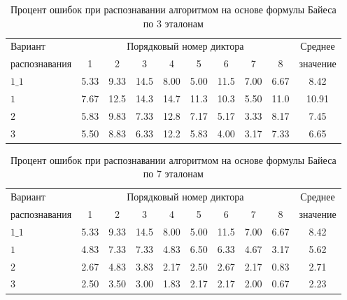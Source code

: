 \begin{table}[h]
	\centering
	\caption{Процент ошибок при распознавании алгоритмом на основе формулы Байеса по 3 эталонам}
	\label{tab:subsect3_2_3_tab1}
	\begin{tabular}{| l | c | c | c | c | c | c | c | c | c |}
		\hline
		Вариант & \multicolumn{8}{c|}{Порядковый номер диктора} & Среднее \\
		\hhline{~--------}
		распознавания & \phantom{0} 1 \phantom{0} & \phantom{0} 2 \phantom{0} & \phantom{0} 3 \phantom{0} & \phantom{0} 4 \phantom{0} & \phantom{0} 5 \phantom{0} & \phantom{0} 6 \phantom{0} & \phantom{0} 7 \phantom{0} & \phantom{0} 8 \phantom{0} & значение \\
		\hline
		$1\_1$	& 5.33 & 9.33 & 14.5 & 8.00 & 5.00 & 11.5 & 7.00 & 6.67 & 8.42 \\
		$1$		& 7.67 & 12.5 & 14.3 & 14.7 & 11.3 & 10.3 & 5.50 & 11.0 & 10.91 \\
		$2$		& 5.83 & 9.83 & 7.33 & 12.8 & 7.17 & 5.17 & 3.33 & 8.17 & 7.45 \\
		$3$		& 5.50 & 8.83 & 6.33 & 12.2 & 5.83 & 4.00 & 3.17 & 7.33 & 6.65 \\
		\hline
	\end{tabular}
\end{table}

\begin{table}[h]
	\centering
	\caption{Процент ошибок при распознавании алгоритмом на основе формулы Байеса по 7 эталонам}
	\label{tab:subsect3_2_3_tab2}
	\begin{tabular}{| l | c | c | c | c | c | c | c | c | c |}
		\hline
		Вариант & \multicolumn{8}{c|}{Порядковый номер диктора} & Среднее \\
		\hhline{~--------}
		распознавания & \phantom{0} 1 \phantom{0} & \phantom{0} 2 \phantom{0} & \phantom{0} 3 \phantom{0} & \phantom{0} 4 \phantom{0} & \phantom{0} 5 \phantom{0} & \phantom{0} 6 \phantom{0} & \phantom{0} 7 \phantom{0} & \phantom{0} 8 \phantom{0} & значение \\
		\hline
		$1\_1$	& 5.33 & 9.33 & 14.5 & 8.00 & 5.00 & 11.5 & 7.00 & 6.67 & 8.42 \\
		$1$		& 4.83 & 7.33 & 7.33 & 4.83 & 6.50 & 6.33 & 4.67 & 3.17 & 5.62 \\
		$2$		& 2.67 & 4.83 & 3.83 & 2.17 & 2.50 & 2.67 & 2.17 & 0.83 & 2.71 \\
		$3$		& 2.50 & 3.50 & 3.00 & 1.83 & 2.17 & 2.17 & 2.00 & 0.67 & 2.23 \\	
		\hline
	\end{tabular}
\end{table}


